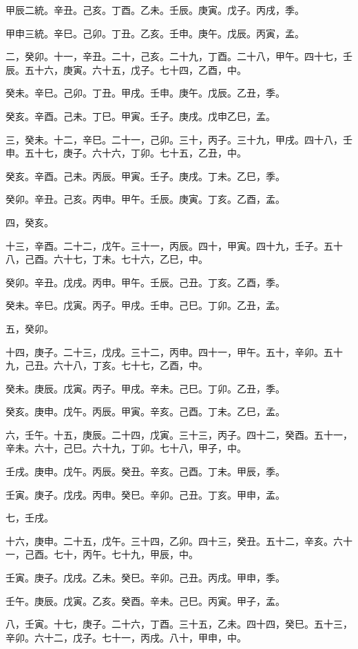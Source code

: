 \begin{pinyinscope}
甲辰二統。辛丑。己亥。丁酉。乙未。壬辰。庚寅。戊子。丙戌，季。

甲申三統。辛巳。己卯。丁丑。乙亥。壬申。庚午。戊辰。丙寅，孟。

二，癸卯。十一，辛丑。二十，己亥。二十九，丁酉。二十八，甲午。四十七，壬辰。五十六，庚寅。六十五，戊子。七十四，乙酉，中。

癸未。辛巳。己卯。丁丑。甲戌。壬申。庚午。戊辰。乙丑，季。

癸亥。辛酉。己未。丁巳。甲寅。壬子。庚戌。戊申乙巳，孟。

三，癸未。十二，辛巳。二十一，己卯。三十，丙子。三十九，甲戌。四十八，壬申。五十七，庚子。六十六，丁卯。七十五，乙丑，中。

癸亥。辛酉。己未。丙辰。甲寅。壬子。庚戌。丁未。乙巳，季。

癸卯。辛丑。己亥。丙申。甲午。壬辰。庚寅。丁亥。乙酉，孟。

四，癸亥。

十三，辛酉。二十二，戊午。三十一，丙辰。四十，甲寅。四十九，壬子。五十八，己酉。六十七，丁未。七十六，乙巳，中。

癸卯。辛丑。戊戌。丙申。甲午。壬辰。己丑。丁亥。乙酉，季。

癸未。辛巳。戊寅。丙子。甲戌。壬申。己巳。丁卯。乙丑，孟。

五，癸卯。

十四，庚子。二十三，戊戌。三十二，丙申。四十一，甲午。五十，辛卯。五十九，己丑。六十八，丁亥。七十七，乙酉，中。

癸未。庚辰。戊寅。丙子。甲戌。辛未。己巳。丁卯。乙丑，季。

癸亥。庚申。戊午。丙辰。甲寅。辛亥。己酉。丁未。乙巳，孟。

六，壬午。十五，庚辰。二十四，戊寅。三十三，丙子。四十二，癸酉。五十一，辛未。六十，己巳。六十九，丁卯。七十八，甲子，中。

壬戌。庚申。戊午。丙辰。癸丑。辛亥。己酉。丁未。甲辰，季。

壬寅。庚子。戊戌。丙申。癸巳。辛卯。己丑。丁亥。甲申，孟。

七，壬戌。

十六，庚申。二十五，戊午。三十四，乙卯。四十三，癸丑。五十二，辛亥。六十一，己酉。七十，丙午。七十九，甲辰，中。

壬寅。庚子。戊戌。乙未。癸巳。辛卯。己丑。丙戌。甲申，季。

壬午。庚辰。戊寅。乙亥。癸酉。辛未。己巳。丙寅。甲子，孟。

八，壬寅。十七，庚子。二十六，丁酉。三十五，乙未。四十四，癸巳。五十三，辛卯。六十二，戊子。七十一，丙戌。八十，甲申，中。


\end{pinyinscope}
